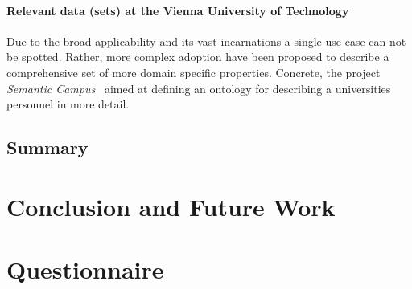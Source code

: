 \documentclass{article}
\begin{document}
\paragraph{Relevant data (sets) at the Vienna University of Technology}
Due to the broad applicability and its vast incarnations a single use case can not be spotted. Rather, more complex adoption have been proposed to describe a comprehensive set of more domain specific properties. Concrete, the project \textit{Semantic Campus}~\cite{inproceedings:semantic-campus} aimed at defining an ontology for describing a universities personnel in more detail. 
\subsection{Summary}

\section{Conclusion and Future Work}

\newpage



\newpage
\appendix
\section{Questionnaire}

\end{document}
